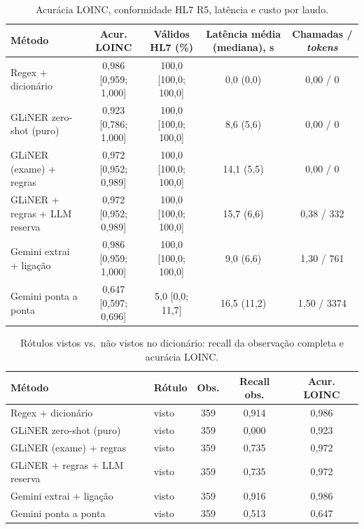 \begin{table}[ht]\centering\small
\caption{Acurácia LOINC, conformidade HL7 R5, latência e custo por laudo.}\label{tab:fhir}
\begin{tabular}{lcccc}\toprule
Método & Acur. LOINC & Válidos HL7 (\%) & Latência média (mediana), s & Chamadas / \textit{tokens}\\\midrule
Regex + dicionário & 0,986 [0,959; 1,000] & 100,0 [100,0; 100,0] & 0,0 (0,0) & 0,00 / 0\\
GLiNER zero-shot (puro) & 0,923 [0,786; 1,000] & 100,0 [100,0; 100,0] & 8,6 (5,6) & 0,00 / 0\\
GLiNER (exame) + regras & 0,972 [0,952; 0,989] & 100,0 [100,0; 100,0] & 14,1 (5,5) & 0,00 / 0\\
GLiNER + regras + LLM reserva & 0,972 [0,952; 0,989] & 100,0 [100,0; 100,0] & 15,7 (6,6) & 0,38 / 332\\
Gemini extrai + ligação & 0,986 [0,959; 1,000] & 100,0 [100,0; 100,0] & 9,0 (6,6) & 1,30 / 761\\
Gemini ponta a ponta & 0,647 [0,597; 0,696] & 5,0 [0,0; 11,7] & 16,5 (11,2) & 1,50 / 3374\\
\bottomrule\end{tabular}\end{table}

\begin{table}[ht]\centering\small
\caption{Rótulos vistos vs.\ não vistos no dicionário: recall da observação completa e acurácia LOINC.}\label{tab:vistos}
\begin{tabular}{llccc}\toprule
Método & Rótulo & Obs. & Recall obs. & Acur. LOINC\\\midrule
Regex + dicionário & visto & 359 & 0,914 & 0,986\\
GLiNER zero-shot (puro) & visto & 359 & 0,000 & 0,923\\
GLiNER (exame) + regras & visto & 359 & 0,735 & 0,972\\
GLiNER + regras + LLM reserva & visto & 359 & 0,735 & 0,972\\
Gemini extrai + ligação & visto & 359 & 0,916 & 0,986\\
Gemini ponta a ponta & visto & 359 & 0,513 & 0,647\\
\bottomrule\end{tabular}\end{table}

